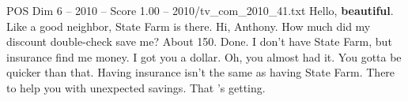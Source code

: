 \begin{textsample}{POS Dim 6 – 2010 – Score 1.00 – 2010/tv\_com\_2010\_41.txt}  \label{ex:f6_pos_066}
Hello, \textbf{beautiful}.
Like a good neighbor, State Farm is there.
Hi, Anthony.
How much did my discount double-check save me?
About 150.
Done.
I don't have State Farm, but insurance find me money.
I got you a dollar.
Oh, you almost had it.
You gotta be quicker than that.
Having insurance isn't the same as having State Farm.
There to help you with unexpected savings.
That 's getting.

\end{textsample}
